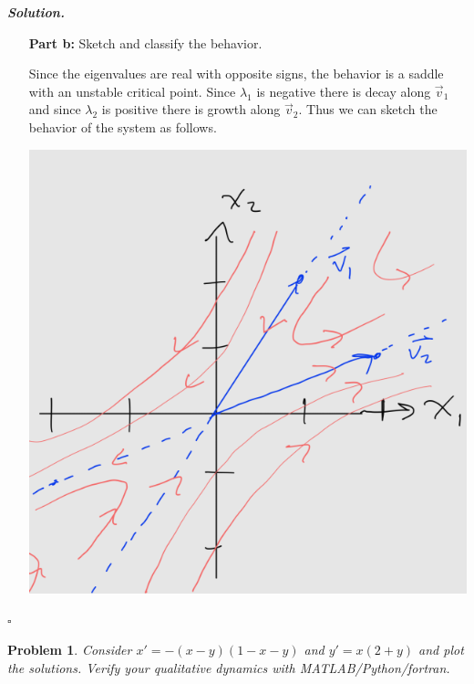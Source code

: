 \documentclass[12pt]{report}
\newtheorem{problem}{Problem}
\newenvironment{solution}[1][\it{Solution}]{\textbf{#1. } }{$\square$}
\begin{document}
\begin{solution}
\begin{enumerate}
        
        
        
        \item [{\bf Part b:}] Sketch and classify the behavior.
        
        \noindent
        Since the eigenvalues are real with opposite signs, the behavior is a saddle with an unstable critical point. Since $\lambda_1$ is negative there is decay along $\vec{v}_1$ and since $\lambda_2$ is positive there is growth along $\vec{v}_2$. Thus we can sketch the behavior of the system as follows.

        \begin{center}
            \includegraphics[width=.6\linewidth]{images/7.PNG}
        \end{center}
    \end{enumerate}
\end{solution}
\newpage



\begin{problem}
    Consider $x' = -(x-y)(1 -x-y)$ and $y' = x(2 +y)$ and plot the solutions. Verify your qualitative dynamics with MATLAB/Python/fortran.
\end{problem}
\end{document}
